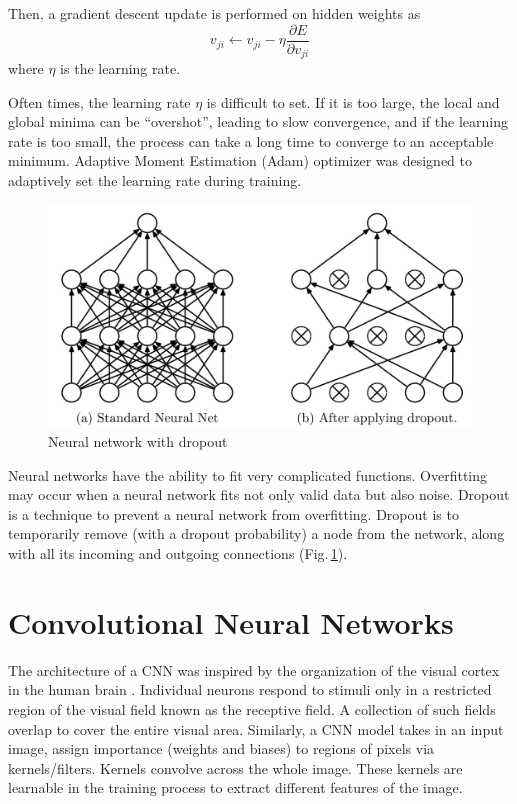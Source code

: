 Then, a gradient descent update is performed on hidden weights as
$$v_{ji} \leftarrow v_{ji} - \eta \frac{\partial E}{\partial v_{ji}}$$
where $\eta$ is the learning rate.

Often times, the learning rate $\eta$ is difficult to set. If it is too large, the local and global minima can be “overshot”, leading to slow convergence, and if the learning rate is too small, the process can take a long time to converge to an acceptable minimum. Adaptive Moment Estimation (Adam) \citep{adam} optimizer was designed to adaptively set the learning rate during training.

\begin{figure}[h]
	\centering
	\includegraphics[scale=0.4]{Figs/dropout.png}
    \caption{Neural network with dropout \citep{JMLR:v15:srivastava14a}}
    \label{dropout}
\end{figure}

Neural networks have the ability to fit very complicated functions. Overfitting may occur when a neural network fits not only valid data but also noise. Dropout \citep{JMLR:v15:srivastava14a} is a technique to prevent a neural network from overfitting. Dropout is to temporarily remove (with a dropout probability) a node from the network, along with all its incoming and outgoing connections (Fig.\,\ref{dropout}).


\section{Convolutional Neural Networks}
The architecture of a CNN was inspired by the organization of the visual cortex in the human brain \citep{Fukushima2007}. Individual neurons respond to stimuli only in a restricted region of the visual field known as the receptive field. A collection of such fields overlap to cover the entire visual area. Similarly, a CNN model takes in an input image, assign importance (weights and biases) to regions of pixels via kernels/filters. Kernels convolve across the whole image. These kernels are learnable in the training process to extract different features of the image.

